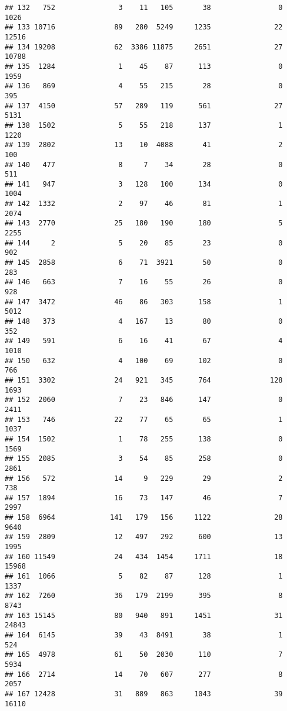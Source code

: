 \documentclass[
]{article}
\begin{document}
\begin{verbatim}
## 132   752               3    11   105       38                0  1026
## 133 10716              89   280  5249     1235               22 12516
## 134 19208              62  3386 11875     2651               27 10788
## 135  1284               1    45    87      113                0  1959
## 136   869               4    55   215       28                0   395
## 137  4150              57   289   119      561               27  5131
## 138  1502               5    55   218      137                1  1220
## 139  2802              13    10  4088       41                2   100
## 140   477               8     7    34       28                0   511
## 141   947               3   128   100      134                0  1004
## 142  1332               2    97    46       81                1  2074
## 143  2770              25   180   190      180                5  2255
## 144     2               5    20    85       23                0   902
## 145  2858               6    71  3921       50                0   283
## 146   663               7    16    55       26                0   928
## 147  3472              46    86   303      158                1  5012
## 148   373               4   167    13       80                0   352
## 149   591               6    16    41       67                4  1010
## 150   632               4   100    69      102                0   766
## 151  3302              24   921   345      764              128  1693
## 152  2060               7    23   846      147                0  2411
## 153   746              22    77    65       65                1  1037
## 154  1502               1    78   255      138                0  1569
## 155  2085               3    54    85      258                0  2861
## 156   572              14     9   229       29                2   738
## 157  1894              16    73   147       46                7  2997
## 158  6964             141   179   156     1122               28  9640
## 159  2809              12   497   292      600               13  1995
## 160 11549              24   434  1454     1711               18 15968
## 161  1066               5    82    87      128                1  1337
## 162  7260              36   179  2199      395                8  8743
## 163 15145              80   940   891     1451               31 24843
## 164  6145              39    43  8491       38                1   524
## 165  4978              61    50  2030      110                7  5934
## 166  2714              14    70   607      277                8  2057
## 167 12428              31   889   863     1043               39 16110

\end{verbatim}
\end{document}
